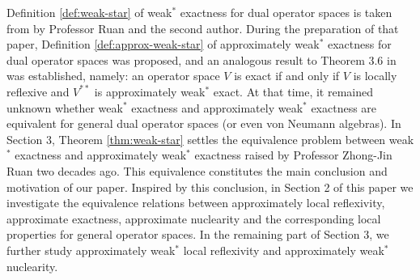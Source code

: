 \documentclass[12pt]{article}
\theoremstyle{definition}
\theoremstyle{remark}
\begin{document}
Definition \ref{def:weak-star} of  weak$^*$ exactness for dual operator spaces is taken from \cite{DR} by Professor Ruan and the second author. During the preparation of that paper, Definition \ref{def:approx-weak-star} of approximately weak$^{*}$ exactness  for dual operator spaces was proposed, and an analogous result to Theorem 3.6 in \cite{DR} was established, namely:
an operator space $V$ is exact if and only if $V$ is locally reflexive and $V^{**}$ is approximately weak$^{*}$ exact.
At that time, it remained unknown whether weak$^{*}$ exactness and approximately weak$^{*}$ exactness are equivalent for general dual operator spaces (or even von Neumann algebras). In Section 3, Theorem \ref{thm:weak-star}  settles the equivalence problem between weak$^*$ exactness and approximately weak$^*$ exactness raised by Professor Zhong-Jin Ruan two decades ago.  This equivalence constitutes the main conclusion and motivation of our paper. 
Inspired by this conclusion, in Section 2 of this paper we investigate the equivalence relations between approximately local reflexivity, approximate exactness, approximate nuclearity and the corresponding local properties for general operator spaces. In the remaining part of Section 3, we further study approximately weak$^*$ local reflexivity and approximately weak$^*$ nuclearity.
\end{document}
